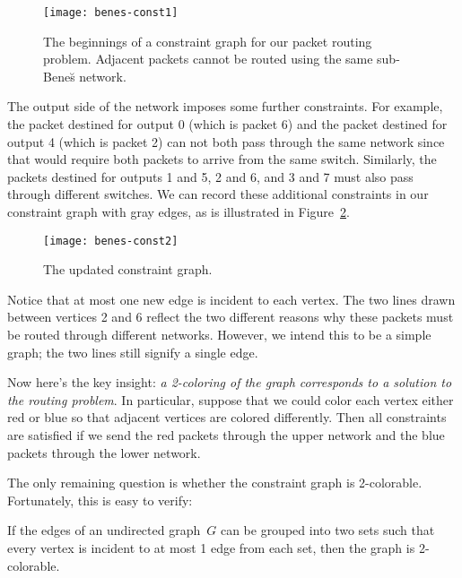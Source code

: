 \begin{figure}

\texttt{[image: benes-const1]}

\caption{The beginnings of a constraint graph for our packet routing
  problem.  Adjacent packets cannot be routed using the same
  sub-Bene\u{s} network.}

\label{fig:6EV}

\end{figure}

The output side of the network imposes some further constraints.  For
example, the packet destined for output 0 (which is packet 6) and the
packet destined for output 4 (which is packet 2) can not both pass
through the same network since that would require both packets to
arrive from the same switch.  Similarly, the packets destined for
outputs 1 and 5, 2 and 6, and 3 and 7 must also pass through different
switches.  We can record these additional constraints in our
constraint graph with gray edges, as is illustrated in
Figure~\ref{fig:6EW}.

\begin{figure}

\texttt{[image: benes-const2]}

\caption{The updated constraint graph.}

\label{fig:6EW}

\end{figure}

Notice that at most one new edge is incident to each vertex.
The two lines drawn between vertices 2 and 6 reflect the two different
reasons why these packets must be routed through different networks.
However, we intend this to be a simple graph; the two lines still
signify a single edge.

Now here's the key insight: \emph{a 2-coloring of the graph
corresponds to a solution to the routing problem}.  In particular,
suppose that we could color each vertex either red or blue so that
adjacent vertices are colored differently.  Then all constraints are
satisfied if we send the red packets through the upper network and the
blue packets through the lower network.

The only remaining question is whether the constraint graph is
2-colorable.  Fortunately, this is easy to verify:

\begin{lemma}\label{deg1-union}
  If the edges of an undirected graph~$G$ can be grouped into two sets
  such that every vertex is incident to at most 1 edge from each set,
  then the graph is 2-colorable.
\end{lemma}

